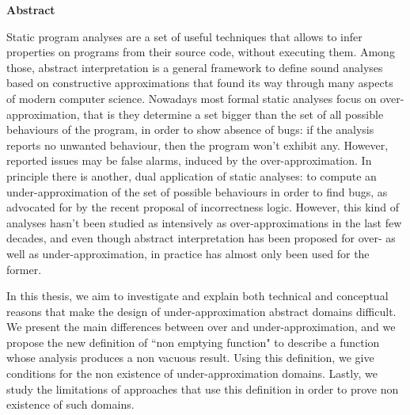 \thispagestyle{plain}
\begin{center}
	\Large
%
%
%
	\textbf{Abstract}
\end{center}
Static program analyses are a set of useful techniques that allows to infer properties on programs from their source code, without executing them. Among those, abstract interpretation is a general framework to define sound analyses based on constructive approximations that found its way through many aspects of modern computer science.
Nowadays most formal static analyses focus on over-approximation, that is they determine a set bigger than the set of all possible behaviours of the program, in order to show absence of bugs: if the analysis reports no unwanted behaviour, then the program won't exhibit any. However, reported issues may be false alarms, induced by the over-approximation.
In principle there is another, dual application of static analyses: to compute an under-approximation of the set of possible behaviours in order to find bugs, as advocated for by the recent proposal of incorrectness logic. However, this kind of analyses hasn't been studied as intensively as over-approximations in the last few decades, and even though abstract interpretation has been proposed for over- as well as under-approximation, in practice has almost only been used for the former.

In this thesis, we aim to investigate and explain both technical and conceptual reasons that make the design of under-approximation abstract domains difficult. We present the main differences between over and under-approximation, and we propose the new definition of ``non emptying function" to describe a function whose analysis produces a non vacuous result. Using this definition, we give conditions for the non existence of under-approximation domains. Lastly, we study the limitations of approaches that use this definition in order to prove non existence of such domains.
